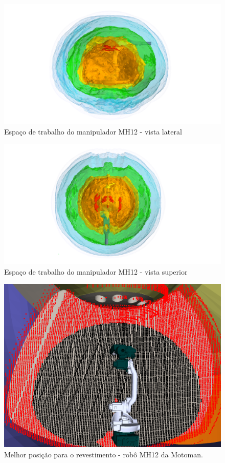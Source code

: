 \begin{figure}[h!]	
	\centering
	\includegraphics[width=\columnwidth]{detail/figs/bighatch/mh12_front.png}
	\caption{Espaço de trabalho do manipulador MH12 - vista lateral}
	\label{fig::mh12cin1}
\end{figure}

\begin{figure}[h!]	
	\centering
	\includegraphics[width=\columnwidth]{detail/figs/bighatch/mh12_top.png}
	\caption{Espaço de trabalho do manipulador MH12 - vista superior}
	\label{fig::mh12cin2}
\end{figure}

\begin{figure}[h!]	
	\centering
	\includegraphics[width=0.8\columnwidth]{detail/figs/bighatch/mh12_bestpos.png}
	\caption{Melhor posição para o revestimento - robô MH12 da Motoman.}
	\label{fig::mh12bestpos}
\end{figure}


